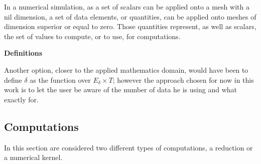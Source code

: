 In a numerical simulation, as a set of scalars can be applied onto a mesh with a nil dimension, a set of data elements, or quantities, can be applied onto meshes of dimension superior or equal to zero. Those quantities represent, as well as scalars, the set of values to compute, or to use, for computations.

\noindent \textbf{Definitions}

Another option, closer to the applied mathematics domain, would have been to define $\delta$ as the function over $E_{\delta} \times T$; however the approach chosen for now in this work is to let the user be aware of the number of data he is using and what exactly for.

\subsection{Computations}

In this section are considered two different types of computations, a reduction or a numerical kernel. 

